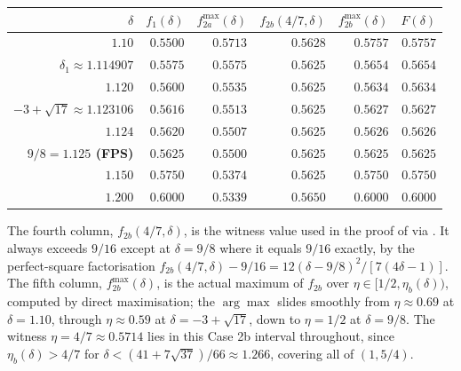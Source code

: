 \documentclass[11pt,a4paper]{article}
\theoremstyle{definition}
\begin{document}
\begin{center}
\begin{tabular}{rrrrrr}
\toprule
$\delta$ & $f_1(\delta)$ & $f_{2a}^{\max}(\delta)$
         & $f_{2b}(4/7, \delta)$ & $f_{2b}^{\max}(\delta)$ & $F(\delta)$ \\
\midrule
$1.10$            & $0.5500$ & $0.5713$ & $0.5628$ & $0.5757$ & $0.5757$ \\
$\delta_1 \approx 1.114907$ & $0.5575$ & $0.5575$ & $0.5625$ & $0.5654$ & $0.5654$ \\
$1.120$           & $0.5600$ & $0.5535$ & $0.5625$ & $0.5634$ & $0.5634$ \\
$-3 + \sqrt{17} \approx 1.123106$ & $0.5616$ & $0.5513$ & $0.5625$ & $0.5627$ & $0.5627$ \\
$1.124$           & $0.5620$ & $0.5507$ & $0.5625$ & $0.5626$ & $0.5626$ \\
\textbf{$9/8 = 1.125$ (FPS)} & $\mathbf{0.5625}$ & $0.5500$ & $\mathbf{0.5625}$ & $\mathbf{0.5625}$ & $\mathbf{0.5625}$ \\
$1.150$           & $0.5750$ & $0.5374$ & $0.5625$ & $0.5750$ & $0.5750$ \\
$1.200$           & $0.6000$ & $0.5339$ & $0.5650$ & $0.6000$ & $0.6000$ \\
\bottomrule
\end{tabular}
\end{center}

\noindent
The fourth column, $f_{2b}(4/7, \delta)$, is the witness value used
in the proof of  via . It always
exceeds $9/16$ except at $\delta = 9/8$ where it equals $9/16$
exactly, by the perfect-square factorisation
$f_{2b}(4/7, \delta) - 9/16 = 12(\delta - 9/8)^2 / [7(4\delta - 1)]$.
The fifth column, $f_{2b}^{\max}(\delta)$, is the actual maximum of
$f_{2b}$ over $\eta \in [1/2, \eta_b(\delta))$, computed by direct
maximisation; the $\arg\max$ slides smoothly from $\eta \approx 0.69$
at $\delta = 1.10$, through $\eta \approx 0.59$ at
$\delta = -3 + \sqrt{17}$, down to $\eta = 1/2$ at $\delta = 9/8$.
The witness $\eta = 4/7 \approx 0.5714$ lies in this Case 2b
interval throughout, since
$\eta_b(\delta) > 4/7$ for $\delta < (41 + 7\sqrt{37})/66 \approx 1.266$,
covering all of $(1, 5/4)$.
\end{document}
